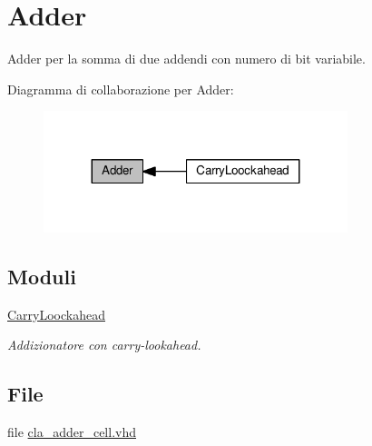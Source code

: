\hypertarget{group___adder}{}\section{Adder}
\label{group___adder}


Adder per la somma di due addendi con numero di bit variabile.  


Diagramma di collaborazione per Adder\+:\nopagebreak
\begin{figure}[H]
\begin{center}
\leavevmode
\includegraphics[width=251pt]{group___adder}
\end{center}
\end{figure}
\subsection*{Moduli}
\begin{DoxyCompactItemize}
\item 
\hyperlink{group___carry_loockahead}{Carry\+Loockahead}
\begin{DoxyCompactList}\small\item\em Addizionatore con carry-\/lookahead. \end{DoxyCompactList}\end{DoxyCompactItemize}
\subsection*{File}
\begin{DoxyCompactItemize}
\item 
file \hyperlink{cla__adder__cell_8vhd}{cla\+\_\+adder\+\_\+cell.\+vhd}
\end{DoxyCompactItemize}
